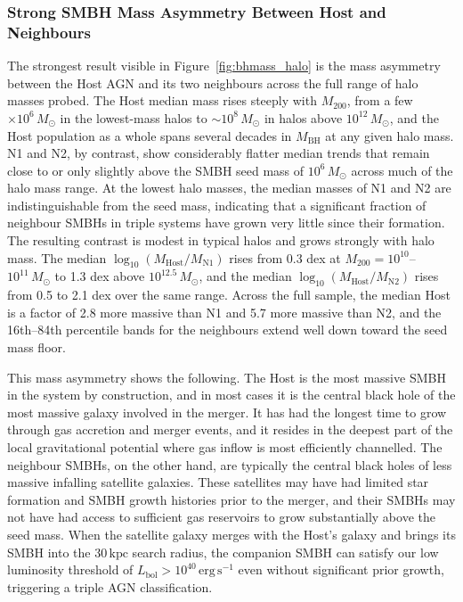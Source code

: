 \documentclass[twocolumn, 10pt]{article}
\begin{document}
\subsubsection{Strong SMBH Mass Asymmetry Between Host and Neighbours}
\label{subsubsec:mass_asymmetry}
 
The strongest result visible in Figure~\ref{fig:bhmass_halo} is the mass asymmetry between the Host AGN and its two neighbours across the full range of halo masses probed. The Host median mass rises steeply with $M_{200}$, from a few $\times 10^{6}\,M_\odot$ in the lowest-mass halos to $\sim 10^{8}\,M_\odot$ in halos above $10^{12}\,M_\odot$, and the Host population as a whole spans several decades in $M_\mathrm{BH}$ at any given halo mass. N1 and N2, by contrast, show considerably flatter median trends that remain close to or only slightly above the SMBH seed mass of $10^6\,M_\odot$ across much of the halo mass range. At the lowest halo masses, the median masses of N1 and N2 are indistinguishable from the seed mass, indicating that a significant fraction of neighbour SMBHs in triple systems have grown very little since their formation. The resulting contrast is modest in typical halos and grows strongly with halo mass. The median $\log_{10}(M_\mathrm{Host}/M_\mathrm{N1})$ rises from 0.3 dex at $M_{200} = 10^{10}$--$10^{11}\,M_\odot$ to 1.3 dex above $10^{12.5}\,M_\odot$, and the median $\log_{10}(M_\mathrm{Host}/M_\mathrm{N2})$ rises from 0.5 to 2.1 dex over the same range. Across the full sample, the median Host is a factor of 2.8 more massive than N1 and 5.7 more massive than N2, and the 16th--84th percentile bands for the neighbours extend well down toward the seed mass floor.
 
This mass asymmetry shows the following. The Host is the most massive SMBH in the system by construction, and in most cases it is the central black hole of the most massive galaxy involved in the merger. It has had the longest time to grow through gas accretion and merger events, and it resides in the deepest part of the local gravitational potential where gas inflow is most efficiently channelled. The neighbour SMBHs, on the other hand, are typically the central black holes of less massive infalling satellite galaxies. These satellites may have had limited star formation and SMBH growth histories prior to the merger, and their SMBHs may not have had access to sufficient gas reservoirs to grow substantially above the seed mass. When the satellite galaxy merges with the Host's galaxy and brings its SMBH into the $30\,\mathrm{kpc}$ search radius, the companion SMBH can satisfy our low luminosity threshold of $L_\mathrm{bol} > 10^{40}\,\mathrm{erg\,s^{-1}}$ even without significant prior growth, triggering a triple AGN classification.
 
\end{document}
